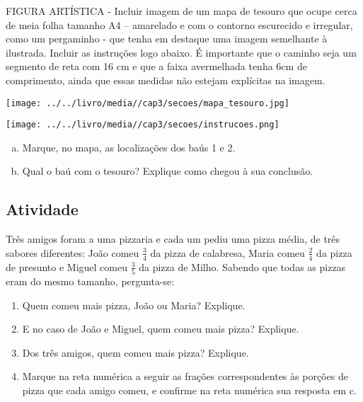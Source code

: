\documentclass[a4,12pt]{book}
\begin{document}
\begin{imagem*}[breakable]{}{}  FIGURA ARTÍSTICA - Incluir imagem de um mapa de tesouro que ocupe cerca de meia folha tamanho A4 – amarelado e com o contorno escurecido e irregular, como um pergaminho - que tenha em destaque uma imagem semelhante à ilustrada. Incluir as instruções logo abaixo. É importante que o caminho seja um segmento de reta com 16 cm e que a faixa avermelhada tenha 6cm de comprimento, ainda que essas medidas não estejam explícitas na imagem.  

\texttt{[image: ../../livro/media//cap3/secoes/mapa\_tesouro.jpg]}  

\texttt{[image: ../../livro/media//cap3/secoes/instrucoes.png]}  

\end{imagem*}

\begin{enumerate}[a)]
 \item Marque, no mapa, as localizações dos baús 1 e 2.
 \item Qual o baú com o tesouro? Explique como chegou à sua conclusão. 
\end{enumerate}

\subsection{Atividade}

Três amigos foram a uma pizzaria e cada um pediu uma pizza média, de três sabores diferentes: João comeu $\frac{3}{4}$ da pizza de calabresa, Maria comeu  $\frac{2}{4}$ da pizza de presunto e Miguel comeu $\frac{3}{5}$ da pizza de Milho. Sabendo que todas as pizzas eram do mesmo tamanho, pergunta-se:
\begin{enumerate} [\quad a)] %
  \item     Quem comeu mais pizza, João ou Maria? Explique.
  \item     E no caso de João e Miguel, quem comeu mais pizza? Explique.
  \item     Dos três amigos, quem comeu mais pizza? Explique.
  \item     Marque na reta numérica a seguir as frações correspondentes às porções de pizza que cada amigo comeu, e confirme na reta numérica sua resposta em c.
\end{enumerate} %

\begin{center}
\end{center}
\end{document}
